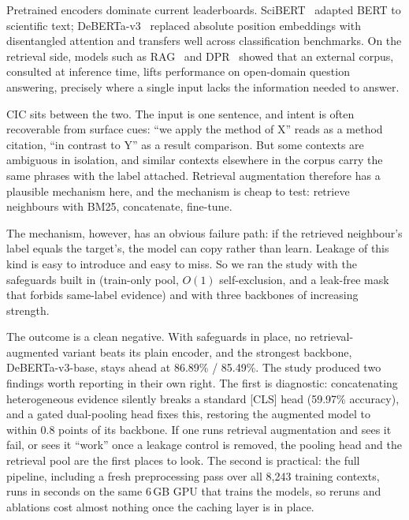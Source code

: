 \documentclass[10pt,twocolumn,twoside]{article}
\begin{document}
Pretrained encoders dominate current leaderboards. SciBERT~\cite{beltagy2019}
adapted BERT to scientific text; DeBERTa-v3~\cite{he2021} replaced absolute
position embeddings with disentangled attention and transfers well across
classification benchmarks. On the retrieval side, models such as
RAG~\cite{lewis2020} and DPR~\cite{karpukhin2020} showed that an external
corpus, consulted at inference time, lifts performance on open-domain
question answering, precisely where a single input lacks the information
needed to answer.

CIC sits between the two. The input is one sentence, and intent is often
recoverable from surface cues: ``we apply the method of X'' reads as a method
citation, ``in contrast to Y'' as a result comparison. But some contexts are
ambiguous in isolation, and similar contexts elsewhere in the corpus carry the
same phrases with the label attached. Retrieval augmentation therefore has a
plausible mechanism here, and the mechanism is cheap to test: retrieve
neighbours with BM25, concatenate, fine-tune.

The mechanism, however, has an obvious failure path: if the retrieved
neighbour's label equals the target's, the model can copy rather than learn.
Leakage of this kind is easy to introduce and easy to miss. So we ran the
study with the safeguards built in (train-only pool, $O(1)$ self-exclusion,
and a leak-free mask that forbids same-label evidence) and with three
backbones of increasing strength.

The outcome is a clean negative. With safeguards in place, no
retrieval-augmented variant beats its plain encoder, and the strongest
backbone, DeBERTa-v3-base, stays ahead at 86.89\% / 85.49\%. The study
produced two findings worth reporting in their own right. The first is
diagnostic: concatenating heterogeneous evidence silently breaks a standard
\mbox{[CLS]} head (59.97\% accuracy), and a gated dual-pooling head fixes this,
restoring the augmented model to within 0.8 points of its backbone. If one
runs retrieval augmentation and sees it fail, or sees it ``work'' once a
leakage control is removed, the pooling head and the retrieval pool are the
first places to look. The second is practical: the full pipeline, including
a fresh preprocessing pass over all 8{,}243 training contexts, runs in
seconds on the same 6\,GB GPU that trains the models, so reruns and ablations
cost almost nothing once the caching layer is in place.
\end{document}
